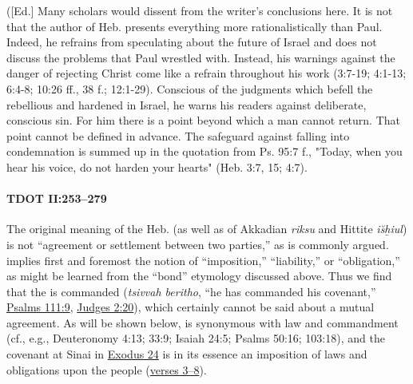 				([Ed.] Many scholars would dissent from the writer's conclusions here. It is not that the author of Heb. presents everything more rationalistically than Paul. Indeed, he refrains from speculating about the future of Israel and does not discuss the problems that Paul wrestled with. Instead, his warnings against the danger of rejecting Christ come like a refrain throughout his work (3:7-19; 4:1-13; 6:4-8; 10:26 ff., 38 f.; 12:1-29). Conscious of the judgments which befell the rebellious and hardened in Israel, he warns his readers against deliberate, conscious sin. For him there is a point beyond which a man cannot return. That point cannot be defined in advance. The safeguard against falling into condemnation is summed up in the quotation from Ps. 95:7 f., "Today, when you hear his voice, do not harden your hearts" (Heb. 3:7, 15; 4:7). 
				
		\paragraph{TDOT II:253--279}
			\label{COVENANT-TDOT}
			
			The original meaning of the Heb.  (as well as of Akkadian \textit{riksu} and Hittite \textit{i\u{s}\b{h}iul}) is not ``agreement or settlement between two parties,'' as is commonly argued.  implies first and foremost the notion of ``imposition,'' ``liability,'' or ``obligation,'' as might be learned from the ``bond'' etymology discussed above. Thus we find that the  is commanded (\textit{tsivvah beritho}, ``he has commanded his covenant,'' \hyperref[PSALMS-111-9]{Psalms 111:9}, \hyperref[JUDGES-2-20]{Judges 2:20}), which certainly cannot be said about a mutual agreement. As will be shown below,  is synonymous with law and commandment (cf., e.g., Deuteronomy 4:13; 33:9; Isaiah 24:5; Psalms 50:16; 103:18), and the covenant at Sinai in \hyperref[EXODUS-24]{Exodus 24} is in its essence an imposition of laws and obligations upon the people (\hyperref[EXODUS-24-3]{verses 3--8}).
			
			